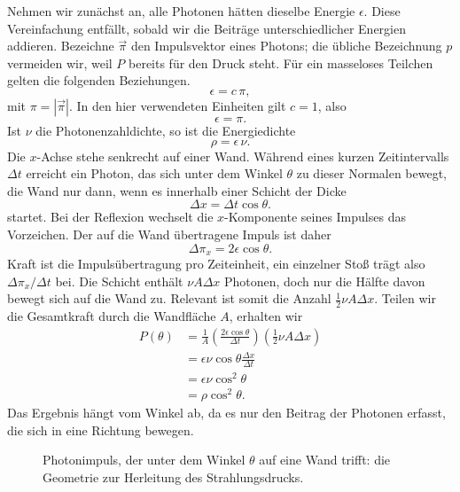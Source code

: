 Nehmen wir zunächst an, alle Photonen hätten dieselbe Energie \(\epsilon\). Diese Vereinfachung entfällt, sobald wir die Beiträge unterschiedlicher Energien addieren. Bezeichne \(\vec{\pi}\) den Impulsvektor eines Photons; die übliche Bezeichnung \(p\) vermeiden wir, weil \(P\) bereits für den Druck steht. Für ein masseloses Teilchen gelten die folgenden Beziehungen.
\begin{equation}
\epsilon=c\,\pi,
\end{equation}
mit \(\pi=|\vec{\pi}|\). In den hier verwendeten Einheiten gilt \(c=1\), also
\begin{equation}
\epsilon=\pi.
\end{equation}
Ist \(\nu\) die Photonenzahldichte, so ist die Energiedichte
\begin{equation}
\rho=\epsilon\,\nu.
\end{equation}
Die \(x\)-Achse stehe senkrecht auf einer Wand. Während eines kurzen Zeitintervalls \(\Delta t\) erreicht ein Photon, das sich unter dem Winkel \(\theta\) zu dieser Normalen bewegt, die Wand nur dann, wenn es innerhalb einer Schicht der Dicke
\begin{equation}
\Delta x=\Delta t\cos\theta.
\end{equation}
startet. Bei der Reflexion wechselt die \(x\)-Komponente seines Impulses das Vorzeichen. Der auf die Wand übertragene Impuls ist daher
\begin{equation}
\Delta \pi_x=2\epsilon\cos\theta.
\end{equation}
Kraft ist die Impulsübertragung pro Zeiteinheit, ein einzelner Stoß trägt also \(\Delta \pi_x/\Delta t\) bei. Die Schicht enthält \(\nu A\Delta x\) Photonen, doch nur die Hälfte davon bewegt sich auf die Wand zu. Relevant ist somit die Anzahl \(\tfrac12 \nu A\Delta x\). Teilen wir die Gesamtkraft durch die Wandfläche \(A\), erhalten wir
\begin{align}
P(\theta)
&=
\frac{1}{A}
\left(\frac{2\epsilon\cos\theta}{\Delta t}\right)
\left(\frac12 \nu A\Delta x\right) \\
&=
\epsilon\nu\cos\theta\frac{\Delta x}{\Delta t} \\
&=
\epsilon\nu\cos^2\theta \\
&=
\rho\cos^2\theta.
\end{align}
Das Ergebnis hängt vom Winkel ab, da es nur den Beitrag der Photonen erfasst, die sich in eine Richtung bewegen.

\begin{figure}[htbp]
\centering
{}
\caption{Photonimpuls, der unter dem Winkel \(\theta\) auf eine Wand trifft: die Geometrie zur Herleitung des Strahlungsdrucks.}
\label{fig:c05-photon-pressure}
\end{figure}

